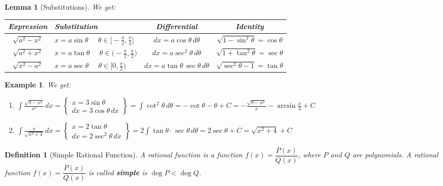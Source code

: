 \documentclass[12pt]{article}
\newtheorem{definition}{Definition}[subsection]
\newtheorem{lemma}{Lemma}[subsection]
\newtheorem{example}{Example}[subsection]
\begin{document}
\begin{lemma}[Substitutions]
  We get:
  \begin{table}[ht]
    \centering
    \begin{tabular}{|c|p{2.3cm}|c|c|}\hline
      Expression & Substitution & Differential & Identity \\\hline
      $\sqrt{a^2-x^2}$  & $x=a\sin{\theta}$ $\quad\theta\in\big[-\tfrac{\pi}{2},\tfrac{\pi}{2}\big]$ & $dx=a\cos{\theta}\,d\theta$  & $\sqrt{1-\sin^2{\theta}}=\cos{\theta}$  \\\hline
      $\sqrt{a^2+x^2}$  & $x=a\tan{\theta}$ $\quad\theta\in\big(-\tfrac{\pi}{2},\tfrac{\pi}{2}\big)$ & $dx=a\sec^2{\theta}\,d\theta$  & $\sqrt{1+\tan^2{\theta}}=\sec{\theta}$  \\\hline
      $\sqrt{x^2-a^2}$  & $x=a\sec{\theta}$ $\quad\theta\in\big[0,\tfrac{\pi}{2}\big)$ & $dx=a\tan{\theta}\,\sec{\theta}\,d\theta$  & $\sqrt{\sec^2{\theta}-1}=\tan{\theta}$ \\\hline
    \end{tabular}
  \end{table}
\end{lemma}

\begin{example}
  We get:
  \begin{enumerate}
    \item $\displaystyle\int\frac{\sqrt{9-x^2}}{x^2}\,dx=\left\{\begin{array}{lr}x=3\sin{\theta}\\dx=3\cos{\theta}\,dx\end{array}\right\}=\int\cot^2{\theta}\,d\theta=-\cot{\theta}-\theta+C=-\frac{\sqrt{9-x^2}}{x}-\arcsin{\frac{x}{3}}+C$
    \item $\displaystyle\int\frac{x}{\sqrt{x^2+4}}\,dx=\left\{\begin{array}{lr}x=2\tan{\theta}\\dx=2\sec^2{\theta}\,dx\end{array}\right\}=2\int\tan{\theta}\cdot\sec{\theta}\,d\theta=2\sec{\theta}+C=\sqrt{x^2+4}+C$
  \end{enumerate}
\end{example}

\begin{definition}[Simple Rational Function]
  A rational function is a function $f(x)=\dfrac{P(x)}{Q(x)}$, where $P$ and $Q$ are polynomials. A rational function $f(x)=\dfrac{P(x)}{Q(x)}$ is called \textbf{simple} is $\deg P<\deg Q$.
\end{definition}
\end{document}
